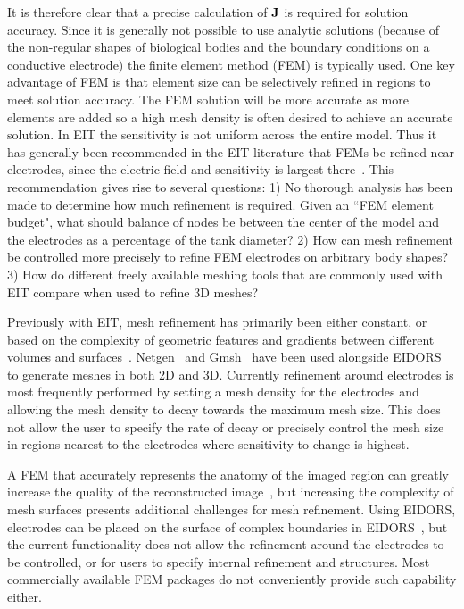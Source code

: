 \documentclass[12pt]{iopart}
\begin{document}
It is therefore clear that a precise  calculation of $\bf J$ is
required for solution accuracy. Since it is generally not
possible to use analytic solutions (because of the non-regular
shapes of biological bodies and the boundary conditions on a
conductive electrode) the finite element method (FEM) is typically
used. 
One key advantage of FEM is that element size can be
selectively refined in regions to meet solution accuracy. 
The FEM solution will be more accurate as more elements are
added so a high mesh density is often desired to achieve an 
accurate solution. In EIT the sensitivity is not uniform 
across the entire model.
Thus
it has generally been recommended in the EIT literature 
that FEMs be refined near electrodes, since the electric
field and sensitivity is largest there~\parencite{adler_electrical_2017}. 
This recommendation gives rise to several questions: 
1) No thorough analysis has been made to determine how much 
refinement is required. Given an ``FEM element budget", what should
balance of nodes be between the center of the model and the electrodes as a
percentage of the tank diameter?
2) How can mesh refinement be controlled more precisely 
to refine FEM electrodes on arbitrary
body shapes? 
3) How do different freely available meshing tools that are
commonly used with EIT compare when used to refine 3D meshes?

Previously with EIT, mesh refinement has primarily been either 
constant, or based on 
the complexity of geometric features
and gradients between different volumes and surfaces~\parencite{grychtol_fem_2013}.  
Netgen~\parencite{schoberl_netgen_1997} and Gmsh~\parencite{geuzaine_gmsh_2009} have been used alongside 
EIDORS~\parencite{adler_uses_2006} to generate meshes in both 2D and 3D. 
Currently refinement around electrodes is most frequently performed by 
setting a mesh density for the electrodes and allowing the mesh density to 
decay towards the maximum mesh size. This does not allow the user to specify 
the rate of decay or precisely control the mesh size in regions nearest to 
the  electrodes where sensitivity to change is highest.

A FEM that accurately represents the anatomy of the imaged region 
can greatly increase the quality of the reconstructed image~\parencite{grychtol_impact_2012},
but increasing the complexity of mesh surfaces presents additional challenges for
mesh refinement. Using EIDORS,  electrodes can be placed on the surface of complex boundaries in 
EIDORS~\parencite{grychtol_fem_2013}, but the current functionality does not allow the
refinement around the electrodes to be controlled, or for users to specify internal 
refinement and structures.
Most commercially available FEM packages
do not conveniently provide such capability either.
\end{document}
